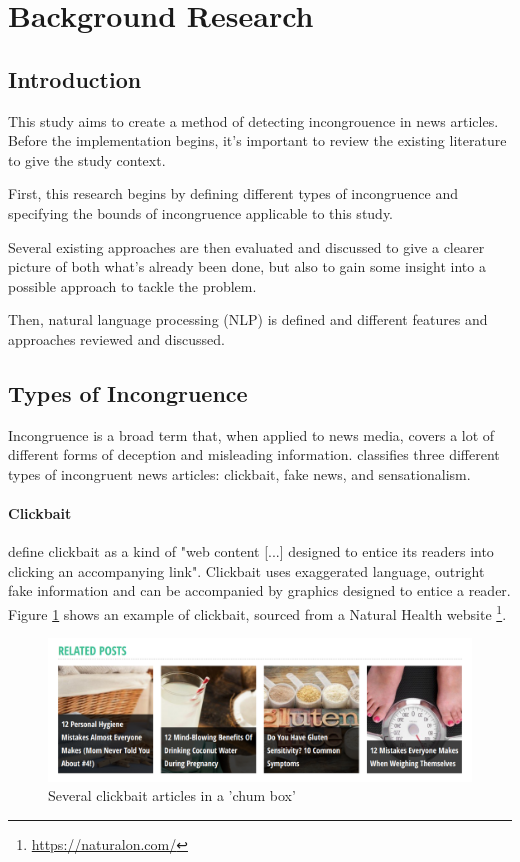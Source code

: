 \section{Background Research}
\subsection{Introduction}
This study aims to create a method of detecting incongrouence in news articles. Before the implementation begins, it's important to review the existing literature to give the study context.

First, this research begins by defining different types of incongruence and specifying the bounds of incongruence applicable to this study. 

Several existing approaches are then evaluated and discussed to give a clearer picture of both what's already been done, but also to gain some insight into a possible approach to tackle the problem.

Then, natural language processing (NLP) is defined and different features and approaches reviewed and discussed.

\subsection{Types of Incongruence}
Incongruence is a broad term that, when applied to news media, covers a lot of different forms of deception and misleading information.  classifies three different types of incongruent news articles: clickbait, fake news, and sensationalism.

\paragraph{Clickbait}
 define clickbait as a kind of "web content [...] designed to entice its readers into clicking an accompanying link". Clickbait uses exaggerated language, outright fake information and can be accompanied by graphics designed to entice a reader. Figure \ref{fig:clickbait} shows an example of clickbait, sourced from a Natural Health website \footnote{\url{https://naturalon.com/}}.

\begin{figure}[ht!]
  \includegraphics[width=\linewidth]{images/clickbait.png}
  \caption{Several clickbait articles in a 'chum box'}
  \label{fig:clickbait}
\end{figure}

